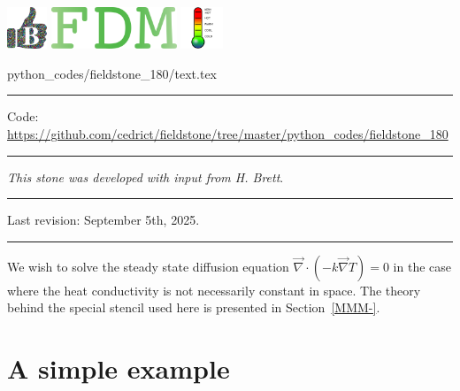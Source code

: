 \noindent
\includegraphics[height=1.25cm]{images/pictograms/benchmark}
\includegraphics[height=1.25cm]{images/pictograms/FDM}
\includegraphics[height=1.25cm]{images/pictograms/temperature}


\begin{flushright} {\tiny {\color{gray} python\_codes/fieldstone\_180/text.tex}} \end{flushright}

\par\noindent\rule{\textwidth}{0.4pt}

\begin{center}
\inpython
{\small Code: \url{https://github.com/cedrict/fieldstone/tree/master/python_codes/fieldstone_180}}
\end{center}

\par\noindent\rule{\textwidth}{0.4pt}

{\sl This stone was developed with input from H. Brett}. 

\par\noindent\rule{\textwidth}{0.4pt}

Last revision: September 5th, 2025.

\par\noindent\rule{\textwidth}{0.4pt}


We wish to solve the steady state diffusion equation $\vec\nabla \cdot (-k \vec\nabla T)=0$
in the case where the heat conductivity is not necessarily constant in space.
The theory behind the special stencil used here is presented in Section~\ref{MMM-}.


\section*{A simple example}

